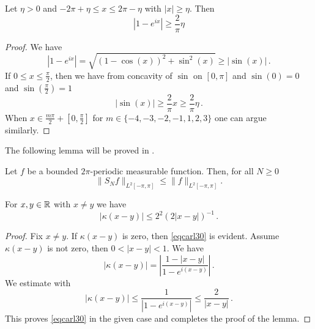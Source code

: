 \begin{lemma}
    \label{lower-secant-bound}
    \leanok
    Let $\eta>0$ and $-2\pi +\eta \le x\le 2\pi-\eta$ with $|x|\ge \eta$. Then
    \begin{equation}
        |1-e^{ix}|\ge \frac{2}{\pi} \eta
    \end{equation}
\end{lemma}
\begin{proof}
    \leanok
    We have
    $$
        |1 - e^{ix}| = \sqrt{(1 - \cos(x))^2 + \sin^2(x)} \ge |\sin(x)|\,.
    $$
    If $0 \le x \le \frac{\pi}{2}$, then we have from concavity of $\sin$ on $[0, \pi]$ and $\sin(0) = 0$ and $\sin(\frac{\pi}{2}) = 1$
    $$
        |\sin(x)| \ge \frac{2}{\pi} x \ge \frac{2}{\pi} \eta\,.
    $$
    When $x\in \frac{m\pi}{2} + [0, \frac{\pi}{2}]$ for $m \in \{-4, -3, -2, -1, 1, 2, 3\}$ one can argue similarly.
\end{proof}

The following lemma will be proved in .

\begin{lemma}
\label{spectral-projection-bound}
    Let $f$ be a bounded $2\pi$-periodic measurable function. Then, for all $N\ge 0$
   \begin{equation}\label{snbound}
   \|S_Nf\|_{L^2[-\pi, \pi]} \le \|f\|_{L^2[-\pi, \pi]}.
   \end{equation}
\end{lemma}

\begin{lemma}
\label{Hilbert-kernel-bound}
\leanok
{}
    For $x,y\in {\mathbb{R}}$ with $x\neq y$ we have
    \begin{equation}\label{eqcarl30}
        |\kappa(x-y)|\le 2^2(2|x-y|)^{-1}\, .
    \end{equation}
\end{lemma}
\begin{proof}
\leanok
    Fix $x\neq y$. If $\kappa(x-y)$ is zero, then \eqref{eqcarl30} is evident. Assume $\kappa(x-y)$ is not zero, then $0<|x-y|<1$.
    We have
\begin{equation}\label{eqcarl31}
|\kappa(x-y)|=\left|\frac {1-|x-y|}{1-e^{i(x-y)}}\right|\, .
\end{equation}
We estimate
with 
\begin{equation}\label{eqcarl311}
|\kappa(x-y)|\le \frac {1}{|1-e^{i(x-y)}|}\le \frac 2{|x-y|}\, .
\end{equation}
This proves \eqref{eqcarl30} in the given case and completes the proof of the lemma.
\end{proof}

